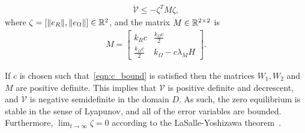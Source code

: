 \begin{gather*}
	\dot{\mathcal{V}} \leq -\zeta^T M \zeta ,
\end{gather*}
where $\zeta=[\|e_R\|,\|e_\Omega\|]\in\mathbb{R}^2$, and the matrix \( M \in \mathbb{R}^{2 \times 2} \) is 
\begin{gather*}
	M = \begin{bmatrix}
		k_R c & \frac{k_\Omega c}{2} \\
		\frac{k_\Omega c}{2} & k_\Omega - c \lambda_M H
	\end{bmatrix}.
\end{gather*}

If \( c \) is chosen such that~\cref{eqn:c_bound} is satisfied then the matrices \( W_1, W_2 \) and \( M \) are positive definite.
This implies that $\mathcal{V}$ is positive definite and decrescent, and $\dot{\mathcal{V}}$ is negative semidefinite in the domain $D$. As such, the zero equilibrium is stable in the sense of Lyapunov, and all of the error variables are bounded. Furthermore, $\lim_{t\to\infty} \zeta=0$ according to the LaSalle-Yoshizawa theorem~\cite{khalil1996}. 

%	
%	

